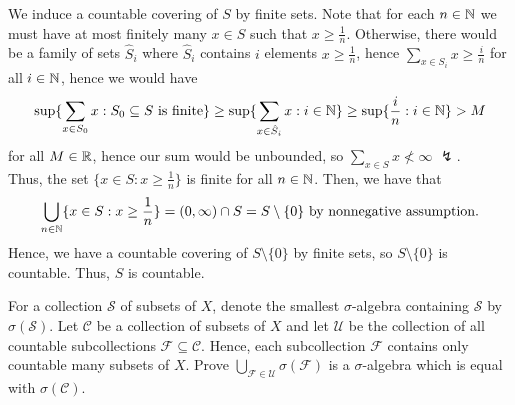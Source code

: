 \documentclass[a4paper]{article}
\begin{document}
\begin{solution}
	We induce a countable covering of \(S\) by finite sets. Note that for each \(n \in \mathbb{N}\) we must have at most finitely many \(x \in S\) such that \(x \ge \frac{1}{n}\). Otherwise, there would be a family of sets \(\hat{S}_{i}\) where \(\hat{S}_{i}\) contains \(i\) elements \(x \ge \frac{1}{n}\), hence \(\sum_{x \in S_{i}}^{} x \ge \frac{i}{n}\) for all \(i \in \mathbb{N}\), hence we would have \[
	\sup \{\sum_{ x\in S_0}^{} x : S_0 \subseteq S \text{ is finite}\} \ge \sup \{\sum_{ x \in \hat{S}_{i}}^{} x : i \in \mathbb{N}\}  \ge \sup \{\frac{i}{n} :  i \in \mathbb{N}\} > M
	\]
for all \(M \in \mathbb{R}\), hence our sum would be unbounded, so \(\sum_{x \in S}^{} x \not < \infty\) \(\lightning\).\\
Thus, the set \(\{x \in S : x \ge \frac{1}{n}\} \) is finite for all \(n \in \mathbb{N}\). Then, we have that \[
	\bigcup_{n \in \mathbb{N}} \{x \in S : x \ge \frac{1}{n}\}  = \left( 0, \infty \right) \cap S =  S \setminus \{0\} \text{ by nonnegative assumption}
.\]
Hence, we have a countable covering of \(S \setminus \{0\} \) by finite sets, so \(S \setminus \{0\} \) is countable. Thus, \(S\) is countable.
\end{solution}
\newpage
\begin{problem}[16]
	For a collection \(\mathscr{S}\) of subsets of \(X\), denote the smallest \(\sigma\)-algebra containing \(\mathscr{S}\) by \(\sigma\left( \mathscr{S} \right) \). Let \(\mathscr{C}\) be a collection of subsets of \(X\) and let \(\mathscr{U}\) be the collection of all countable subcollections \(\mathscr{F}\subseteq \mathscr{C}\). Hence, each subcollection \(\mathscr{F}\) contains only countable many subsets of \(X\). Prove \(\bigcup_{\mathscr{F} \in \mathscr{U}}  \sigma \left( \mathscr{F} \right) \) is a \(\sigma\)-algebra which is equal with \(\sigma\left( \mathscr{C} \right) \).
\end{problem}
\end{document}
